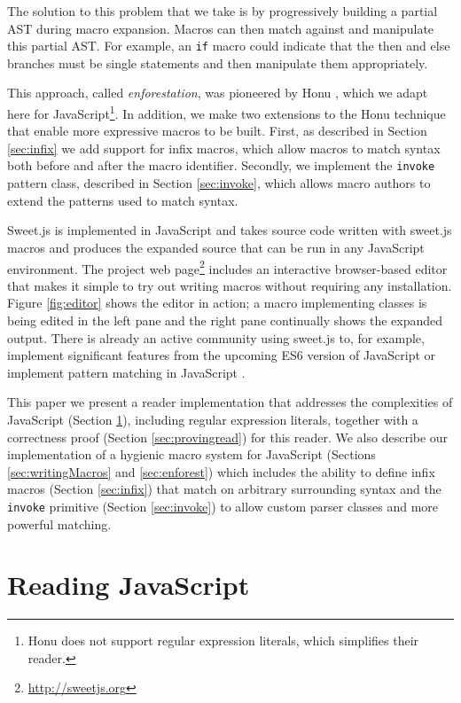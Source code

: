 \documentclass[preprint,10pt]{sigplanconf}
\begin{document}
The solution to this problem that we take is by progressively building
a partial AST during macro expansion. Macros can then match against
and manipulate this partial AST. For example, an \verb!if! macro
could indicate that the then and else branches must be single
statements and then manipulate them appropriately.


This approach, called \emph{enforestation}, was pioneered by Honu
\cite{Rafkind2012,Rafkind2013}, which we adapt here for
JavaScript\footnote{Honu does not support regular expression literals,
  which simplifies their reader. }. In addition, we make two
extensions to the Honu technique that enable more expressive macros to be built. First, as described in Section
\ref{sec:infix} we add support for infix macros, which allow macros to
match syntax both before and after the macro identifier. Secondly, we
implement the \verb!invoke! pattern class, described in Section
\ref{sec:invoke}, which allows macro authors to extend the patterns
used to match syntax.

Sweet.js is implemented in JavaScript and takes source code written with sweet.js macros and produces the expanded source that can be run in any JavaScript environment. 
The project web page\footnote{\url{http://sweetjs.org}} includes an interactive browser-based editor that makes it simple to try out writing macros without requiring any installation.
Figure \ref{fig:editor} shows the editor in action; a macro implementing classes is being edited in the left pane and the right pane continually shows the expanded output.
There is already an active community using sweet.js to, for example, implement
significant features from the upcoming ES6 version of JavaScript \cite{Long} or implement pattern matching in JavaScript \cite{Faubion}.

This paper we present a reader implementation that addresses the complexities of JavaScript (Section \ref{sec:read}), including regular expression literals, together with a correctness proof (Section \ref{sec:provingread}) for this reader.
We also describe our implementation of a hygienic macro system for JavaScript (Sections \ref{sec:writingMacros} and \ref{sec:enforest}) which includes 
the ability to define infix macros (Section \ref{sec:infix}) that match on arbitrary surrounding syntax and
 the \texttt{invoke} primitive (Section \ref{sec:invoke}) to allow custom parser classes and more powerful matching.



\section{Reading JavaScript}
\label{sec:read}
\end{document}
